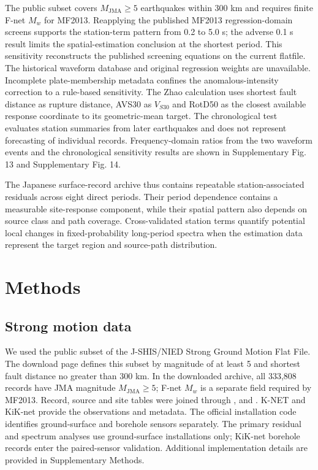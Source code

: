 \documentclass[11pt]{article}
\begin{document}
The public subset covers $M_{\mathrm{JMA}}\geq5$ earthquakes within 300 km and requires finite F-net $M_w$ for MF2013. Reapplying the published MF2013 regression-domain screens supports the station-term pattern from 0.2 to 5.0 s; the adverse 0.1 s result limits the spatial-estimation conclusion at the shortest period. This sensitivity reconstructs the published screening equations on the current flatfile. The historical waveform database and original regression weights are unavailable. Incomplete plate-membership metadata confines the anomalous-intensity correction to a rule-based sensitivity. The Zhao calculation uses shortest fault distance as rupture distance, AVS30 as $V_{S30}$ and RotD50 as the closest available response coordinate to its geometric-mean target. The chronological test evaluates station summaries from later earthquakes and does not represent forecasting of individual records. Frequency-domain ratios from the two waveform events and the chronological sensitivity results are shown in Supplementary Fig. 13 and Supplementary Fig. 14.

The Japanese surface-record archive thus contains repeatable station-associated residuals across eight direct periods. Their period dependence contains a measurable site-response component, while their spatial pattern also depends on source class and path coverage. Cross-validated station terms quantify potential local changes in fixed-probability long-period spectra when the estimation data represent the target region and source-path distribution.

\section{Methods}

\subsection{Strong motion data}

We used the public  subset of the J-SHIS/NIED Strong Ground Motion Flat File\cite{niedflatfile,morikawa2024flatfile}. The download page defines this subset by magnitude of at least 5 and shortest fault distance no greater than 300 km. In the downloaded archive, all 333,808 records have JMA magnitude $M_{\mathrm{JMA}}\geq5$; F-net $M_w$ is a separate field required by MF2013. Record, source and site tables were joined through ,  and . K-NET and KiK-net provide the observations and metadata\cite{kinoshita1998,aoi2004,aoi2020}. The official installation code identifies ground-surface and borehole sensors separately. The primary residual and spectrum analyses use ground-surface installations only; KiK-net borehole records enter the paired-sensor validation. Additional implementation details are provided in Supplementary Methods.
\end{document}
